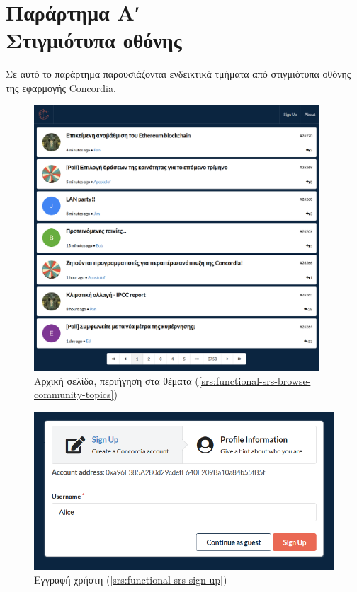 \chapter*{Παράρτημα Αʹ\\[20pt]Στιγμιότυπα οθόνης}\label{appendix-a}


\captionsetup{labelformat=AppendixAFigures}
\setcounter{figure}{0}

Σε αυτό το παράρτημα παρουσιάζονται ενδεικτικά τμήματα από στιγμιότυπα οθόνης της εφαρμογής Concordia.

\vspace{.5\baselineskip}

\begin{figure}[H]
	\centering
	\includegraphics[width=0.95\textwidth]{assets/figures/appendix-a/screenshot-1-topics-screen}
	\caption{Αρχική σελίδα, περιήγηση στα θέματα (\ref{srs:functional-srs-browse-community-topics})}
\end{figure}

\begin{figure}[H]
	\centering
	\includegraphics[width=.9\textwidth]{assets/figures/appendix-a/screenshot-2-signup}
	\caption{Εγγραφή χρήστη (\ref{srs:functional-srs-sign-up})}
\end{figure}

